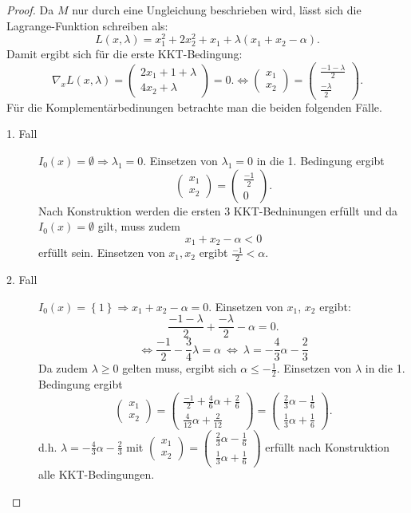 \documentclass[12pt]{extreport} %
\theoremstyle{named}
\theoremstyle{nnamed}
\theoremstyle{itshape}
\theoremstyle{normal}
\begin{document}
\begin{enumerate}
\begin{proof}
			Da $M$ nur durch eine Ungleichung beschrieben wird, lässt sich die Lagrange-Funktion schreiben als:
				$$L(x, \lambda) = x_1^2+2x_2^2+x_1+\lambda (x_1+x_2-\alpha). $$
			Damit ergibt sich für die erste KKT-Bedingung:
				$$ \nabla_x L(x, \lambda)=\begin{pmatrix} 2x_1+1+\lambda \\ 4x_2+ \lambda \end{pmatrix} =0. \Leftrightarrow  \begin{pmatrix}	x_1 \\ x_2\end{pmatrix} =  \begin{pmatrix} \frac{-1-\lambda}{2} \\ \frac{-\lambda}{2} \end{pmatrix}. $$
			Für die Komplementärbedinungen betrachte man die beiden folgenden Fälle. 
			\begin{description}
				\item[1. Fall] $ I_0(x)= \emptyset\Rightarrow \lambda_1=0$. Einsetzen von $\lambda_1=0$ in die 1. Bedingung ergibt 
					$$ \begin{pmatrix}	x_1 \\ x_2\end{pmatrix} =  \begin{pmatrix} \frac{-1}{2} \\ 0\end{pmatrix}. $$
				Nach Konstruktion werden die ersten 3 KKT-Bedninungen erfüllt und da $ I_0(x)= \emptyset $ gilt, muss zudem 
					$$x_1+x_2-\alpha < 0$$ 
					erfüllt sein. Einsetzen von $x_1, x_2$ ergibt $\frac{-1}{2} < \alpha$.
				\item[2. Fall] $ I_0(x)=\left\{1\right\} \Rightarrow x_1+x_2-\alpha= 0$. Einsetzen von $x_1$, $x_2$ ergibt: $$\frac{-1-\lambda}{2} + \frac{-\lambda}{2}-\alpha=0.$$
					$$ \iff \frac{-1}{2} -\frac{ 3}{4}\lambda=\alpha ~ \iff ~ \lambda= -\frac{4}{3}\alpha - \frac{2}{3} $$
					Da zudem $\lambda \geq 0$ gelten muss, ergibt sich $\alpha \leq - \frac{1}{2}$. Einsetzen von $\lambda$ in die 1. Bedingung ergibt 
			$$ \begin{pmatrix} x_1 \\ x_2\end{pmatrix} = \begin{pmatrix} \frac{-1}{2}+\frac{4}{6}\alpha+ \frac{2}{6} \\ \frac{4}{12}\alpha +\frac{2}{12}\end{pmatrix} = \begin{pmatrix} \frac{2}{3}\alpha- \frac{1}{6} \\ \frac{1}{3}\alpha +\frac{1}{6} \end{pmatrix}. $$
			d.h. $\lambda= -\frac{4}{3}\alpha - \frac{2}{3}$ mit $\begin{pmatrix} x_1 \\ x_2\end{pmatrix} = \begin{pmatrix} \frac{2}{3}\alpha- \frac{1}{6} \\ \frac{1}{3}\alpha +\frac{1}{6} \end{pmatrix}$ erfüllt nach Konstruktion alle KKT-Bedingungen. ~\\
			

\end{description}
\end{proof}
\end{enumerate}
\end{document}
